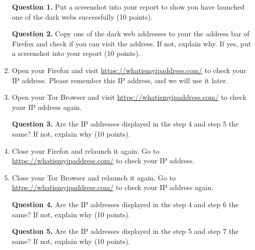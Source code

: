 \documentclass[11pt]{article}
\newcommand{\torbw}{{\sf Tor Browser}\xspace}
\begin{document}
\begin{enumerate}
\textbf{Question 1.} Put a screenshot into your report to show you have launched one of the dark webs successfully (10 points). 

\textbf{Question 2.} Copy one of the dark web addresses to your the address bar of  \textsf{Firefox} and check if you can visit the address. If not, explain why. If yes, put a screenshot into your report (10 points). 

\item Open your \textsf{Firefox} and visit \url{https://whatismyipaddress.com/} to check your IP address. Please remember this IP address, and we will use it later.   

 
\item Open your \torbw and visit \url{https://whatismyipaddress.com/} to check your IP address again.  

\textbf{Question 3.} Are the IP addresses displayed in the step 4 and step 5 the same? If not, explain why (10 points). 

\item  Close your \textsf{Firefox}  and relaunch it again. Go to \url{https://whatismyipaddress.com/} to check your IP address.  

\item Close your \torbw and relaunch it again. Go to \url{https://whatismyipaddress.com/} to check your IP address again. 

\textbf{Question 4.} Are the IP addresses displayed in the step 4 and step 6 the same? If not, explain why (10 points).  

\textbf{Question 5.} Are the IP addresses displayed in the step 5 and step 7 the same? If not, explain why (10 points). 

 
\end{enumerate}
\end{document}

